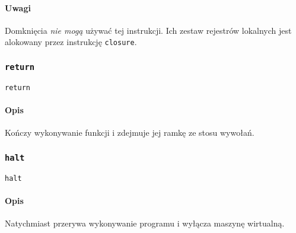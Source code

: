 \paragraph*{Uwagi} Domknięcia \emph{nie mogą} używać tej instrukcji. Ich zestaw
rejestrów lokalnych jest alokowany przez instrukcję \texttt{closure}.

\subsubsection{\texttt{return}}

\begin{lstlisting}
return
\end{lstlisting}

\paragraph*{Opis} Kończy wykonywanie funkcji i zdejmuje jej ramkę ze stosu
wywołań.

\subsubsection{\texttt{halt}}

\begin{lstlisting}
halt
\end{lstlisting}

\paragraph*{Opis} Natychmiast przerywa wykonywanie programu i wyłącza maszynę
wirtualną.
